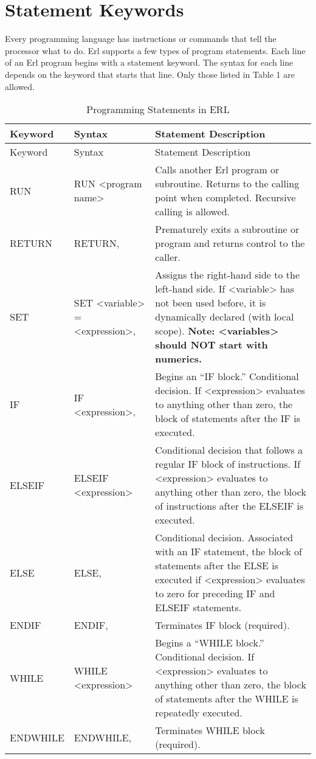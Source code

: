 \section{Statement Keywords}\label{statement-keywords}

Every programming language has instructions or commands that tell the processor what to do. Erl supports a few types of program statements. Each line of an Erl program begins with a statement keyword. The syntax for each line depends on the keyword that starts that line. Only those listed in Table 1 are allowed.

\begin{longtable}{@{}ll>{\raggedright}p{3in}@{}}

\caption{Programming Statements in ERL \label{table:programming-statements-in-erl}} \tabularnewline
\toprule
Keyword & Syntax & Statement Description \tabularnewline
\midrule
\endfirsthead

\caption[]{Programming Statements in ERL}
\toprule
Keyword & Syntax & Statement Description \tabularnewline
\midrule
\endhead

RUN & RUN <program name> & Calls another Erl program or subroutine. Returns to the calling point when completed. Recursive calling is allowed. \tabularnewline
RETURN & RETURN, & Prematurely exits a subroutine or program and returns control to the caller. \tabularnewline
SET & SET <variable> = <expression>, & Assigns the right-hand side to the left-hand side. If <variable> has not been used before, it is dynamically declared (with local scope). \textbf{Note: <variables> should NOT start with numerics.} \tabularnewline
IF & IF <expression>, & Begins an ``IF block.'' Conditional decision. If <expression> evaluates to anything other than zero, the block of statements after the IF is executed. \tabularnewline
ELSEIF & ELSEIF <expression> & Conditional decision that follows a regular IF block of instructions. If <expression> evaluates to anything other than zero, the block of instructions after the ELSEIF is executed. \tabularnewline
ELSE & ELSE, & Conditional decision. Associated with an IF statement, the block of statements after the ELSE is executed if <expression> evaluates to zero for preceding IF and ELSEIF statements. \tabularnewline
ENDIF & ENDIF, & Terminates IF block (required). \tabularnewline
WHILE & WHILE <expression> & Begins a ``WHILE block.'' Conditional decision. If <expression> evaluates to anything other than zero, the block of statements after the WHILE is repeatedly executed. \tabularnewline
ENDWHILE & ENDWHILE, & Terminates WHILE block (required). \tabularnewline
\bottomrule
\end{longtable}

